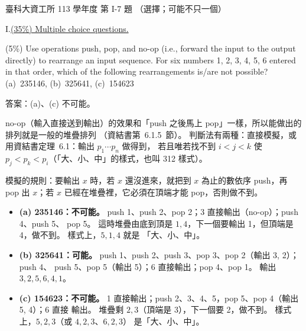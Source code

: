 \begin{pastexam}[label={px:ntust-113-ice-06}]{臺科大資工所 113 學年度 第 I-7 題}
（選擇；可能不只一個）

I.\quad \underline{(35\%) Multiple choice questions.}

(5\%) Use operations push, pop, and no-op (i.e., forward the input to the output directly) to
rearrange an input sequence. For six numbers 1, 2, 3, 4, 5, 6 entered in that order, which of the
following rearrangements is/are not possible?\\
(a)~235146, (b)~325641, (c)~154623
\end{pastexam}

\begin{pastsoln}
答案：(a)、(c) 不可能。

no-op（輸入直接送到輸出）的效果和「push 之後馬上 pop」一樣，所以能做出的排列就是一般的堆疊排列
（資結書第~6.1.5~節）。 判斷法有兩種：直接模擬，或用資結書定理~6.1：輸出 $p_1 \cdots p_n$ 做得到，
若且唯若找不到 $i < j < k$ 使 $p_j < p_k < p_i$（「大、小、中」的樣式，也叫 312 樣式）。

模擬的規則：要輸出 $x$ 時，若 $x$ 還沒進來，就把到 $x$ 為止的數依序 push，再 pop 出 $x$；若 $x$
已經在堆疊裡，它必須在頂端才能 pop，否則做不到。
\begin{itemize}
\item \textbf{(a) 235146：不可能。} push 1、push 2、pop 2；3 直接輸出（no-op）；push 4、push 5、
pop 5。 這時堆疊由底到頂是 $1, 4$，下一個要輸出 1，但頂端是 4，做不到。 樣式上，$5, 1, 4$ 就是
「大、小、中」。
\item \textbf{(b) 325641：可能。} push 1、push 2、push 3、pop 3、pop 2（輸出 3, 2）；push 4、
push 5、pop 5（輸出 5）；6 直接輸出；pop 4、pop 1。 輸出 $3, 2, 5, 6, 4, 1$。
\item \textbf{(c) 154623：不可能。} 1 直接輸出；push 2、3、4、5，pop 5、pop 4（輸出 5, 4）；6 直接
輸出。 堆疊剩 $2, 3$（頂端是 3），下一個要 2，做不到。 樣式上，$5, 2, 3$（或 $4, 2, 3$、$6, 2, 3$）
是「大、小、中」。
\end{itemize}
\end{pastsoln}
